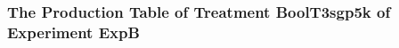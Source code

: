  \begin{frame}
 \fontsize{8pt}{9pt}\selectfont
 \frametitle{ The Production Table of Treatment BoolT3sgp5k of Experiment ExpB }

 \label{ExpBGrammarTable023.tex}  
 \end{frame}

